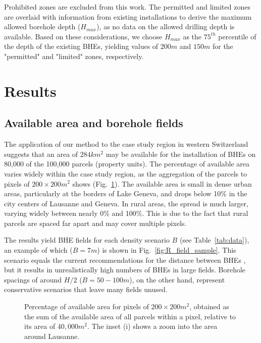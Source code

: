 Prohibited zones are excluded from this work. 
The permitted and limited zones are overlaid with information from existing installations to derive the maximum allowed borehole depth ($H_{max}$), as no data on the allowed drilling depth is available.
Based on these considerations,
we choose $H_{max}$ as the $75^{th}$ percentile of the depth of the existing BHEs, yielding values of $200m$ and $150m$ for the "permitted" and "limited" zones, respectively. 


\section{Results}
\label{results}

\subsection{Available area and borehole fields}

The application of our method to the case study region in western Switzerland suggests that an area of $284 km^2$ may be available for the installation of BHEs on 80,000 of the 100,000 parcels (property units).
The percentage of available area varies widely within the case study region, as the aggregation of the parcels to pixels of $200 \times 200 m^2$ shows (Fig.~\ref{fig:avail_area}).
The available area is small in dense urban areas, particularly at the borders of Lake Geneva, and drops below 10\% in the city centers of Lausanne and Geneva. 
In rural areas, the spread is much larger, varying widely between nearly 0\% and 100\%. 
This is due to the fact that rural parcels are spaced far apart and may cover multiple pixels. 

The results yield BHE fields for each density scenario $B$ (see Table~\ref{tab:data}), an example of which ($B = 7m$) is shown in Fig.~\ref{fig:R_field_sample}.
This scenario equals the current recommendations for the distance between BHEs \cite{miglani_methodology_2018}, but it results in unrealistically high numbers of BHEs in large fields. 
Borehole spacings of around $H/2$ ($B=50-100m$), on the other hand, represent conservative scenarios that leave many fields unused. 

\begin{figure}[tb]
\centering
{}
\caption{Percentage of available area for pixels of $200 \times 200m^2$, obtained as the sum of the available area of all parcels within a pixel, relative to its area of $40,000 m^2$. The inset (i) shows a zoom into the area around Lausanne.}
\label{fig:avail_area}
\end{figure}

